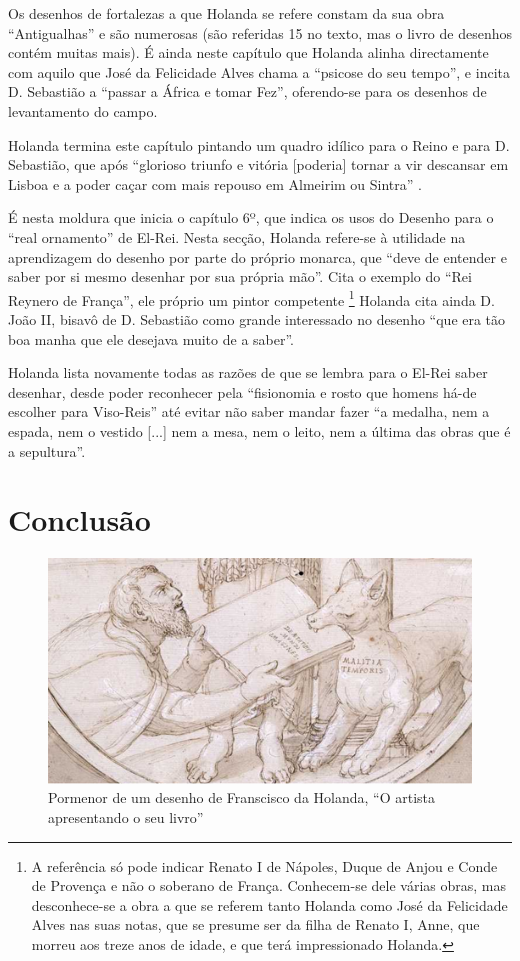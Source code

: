\documentclass{article}
\begin{document}
Os desenhos de fortalezas a que Holanda se refere constam da sua obra
``Antigualhas'' e são numerosas (são referidas 15 no texto, mas o
livro de desenhos contém muitas mais). É ainda neste capítulo que
Holanda alinha directamente com aquilo que José da Felicidade Alves
chama a ``psicose do seu tempo''\cite[notas p.54]{holanda}, e incita
D. Sebastião a ``passar a África e tomar Fez'', oferendo-se para os
desenhos de levantamento do campo.

Holanda termina este capítulo pintando um quadro idílico para o Reino
e para D. Sebastião, que após ``glorioso triunfo e vitória [poderia]
tornar a vir descansar em Lisboa e a poder caçar com mais repouso em
Almeirim ou Sintra'' \cite[fl.45v]{holanda}.

É nesta moldura que inicia o capítulo 6º, que indica os usos do
Desenho para o ``real ornamento'' de El-Rei. Nesta secção, Holanda
refere-se à utilidade na aprendizagem do desenho por parte do próprio
monarca, que ``deve de entender e saber por si mesmo desenhar por sua
própria mão''. Cita o exemplo do ``Rei Reynero de França'', ele
próprio um pintor competente \footnote{A referência só pode indicar
  Renato I de Nápoles, Duque de Anjou e Conde de Provença e não o
  soberano de França. Conhecem-se dele várias obras, mas desconhece-se
  a obra a que se referem tanto Holanda como José da Felicidade Alves
  nas suas notas, que se presume ser da filha de Renato I, Anne, que
  morreu aos treze anos de idade, e que terá impressionado Holanda.}
Holanda cita ainda D. João II, bisavô de D. Sebastião como grande
interessado no desenho ``que era tão boa manha que ele desejava muito
de a saber''.

Holanda lista novamente todas as razões de que se lembra para o El-Rei
saber desenhar, desde poder reconhecer pela ``fisionomia e rosto que
homens há-de escolher para Viso-Reis'' até evitar não saber mandar
fazer ``a medalha, nem a espada, nem o vestido [...] nem a mesa, nem o
leito, nem a última das obras que é a sepultura''.

\section{Conclusão}

\begin{figure}
\centering\includegraphics[height=0.3\textheight,keepaspectratio]
                          {images/malatia-temporis.png}
  \caption{Pormenor de um desenho de Franscisco da Holanda, ``O
    artista apresentando o seu livro''}
  \label{fig:3}
\end{figure}
\end{document}
